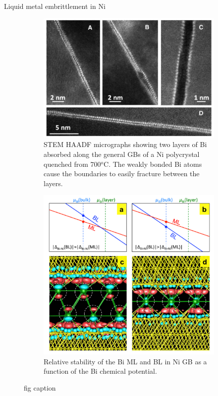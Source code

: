 \documentclass[aspectratio=169]{beamer}
\begin{document}
    \begin{frame}{Liquid metal embrittlement in Ni}
        \begin{figure}
            \centering
            \begin{subfigure}{0.45\textwidth}
                \centering
                \includegraphics[width=\linewidth]{lectures/figures/11_Bi_in_Ni.png}
                \caption{STEM HAADF micrographs showing two layers of Bi absorbed along the general GBs of a Ni polycrystal quenched from 700$^o$C. The weakly bonded Bi atoms cause the boundaries to easily fracture between the layers.\cite{luoRoleBilayerInterfacial2011}}
            \end{subfigure}
            \begin{subfigure}{0.45\textwidth}
                \centering
                \includegraphics[width=0.8\linewidth]{lectures/figures/11_Bi_in_Ni_DFT.png}
                \caption{Relative stability of the Bi ML and BL in Ni GB as a function of the Bi chemical potential.\cite{kangOriginBismuthInducedDecohesion2013}}
            \end{subfigure}
            \caption{fig caption}
            \label{fig}
        \end{figure}
    \end{frame}
\end{document}
